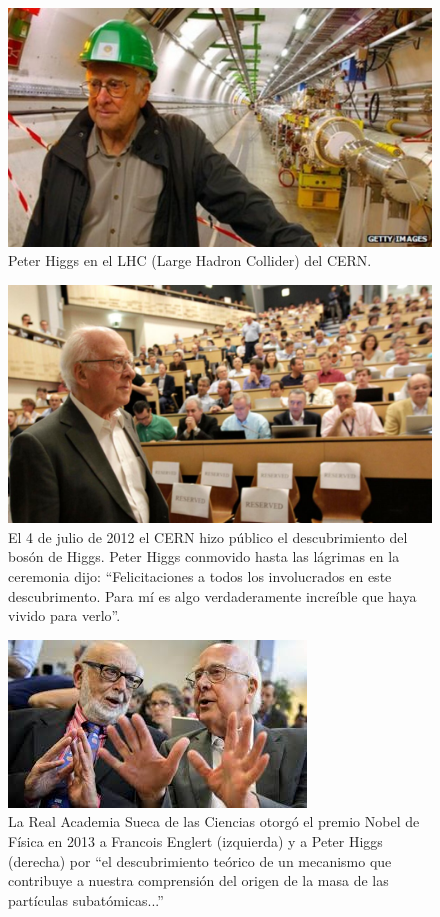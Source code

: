 \documentclass[12pt,a4paper]{report}
\begin{document}
\begin{figure}
\includegraphics[scale=0.5]{images/higgs_lhc.jpg}
\caption{Peter Higgs en el LHC (Large Hadron Collider) del CERN.}
\end{figure}

\begin{figure}
\includegraphics[scale=0.2]{images/higgs_anuncio.jpg}
\caption{El 4 de julio de 2012 el CERN hizo p\'ublico el descubrimiento del bos\'on de Higgs. Peter Higgs conmovido hasta las l\'agrimas en la ceremonia dijo: ``Felicitaciones a todos los involucrados en este descubrimento. Para m\'i es algo verdaderamente incre\'ible que haya vivido para verlo''.}
\end{figure}

\begin{figure}
\includegraphics[scale=1]{images/higgs_englert.jpeg}
\caption{La Real Academia Sueca de las Ciencias otorg\'o el premio Nobel de F\'isica en 2013 a Francois Englert (izquierda) y a Peter Higgs (derecha) por ``el descubrimiento te\'orico de un mecanismo que contribuye a nuestra comprensi\'on del origen de la masa de las part\'iculas subat\'omicas...''}
\end{figure}
\end{document}
